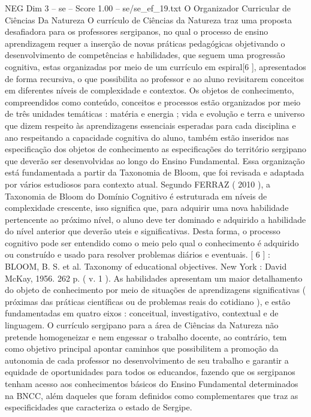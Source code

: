 \begin{textsample}{NEG Dim 3 – se – Score 1.00 – se/se\_ef\_19.txt}  \label{ex:f3_neg_128}
O Organizador Curricular de Ciências Da Natureza O currículo de Ciências da Natureza traz uma proposta desafiadora para os professores sergipanos, no qual o processo de ensino aprendizagem requer a inserção de novas práticas pedagógicas objetivando o desenvolvimento de competências e habilidades, que seguem uma progressão cognitiva, estas organizadas por meio de um currículo em espiral[6 ], apresentados de forma recursiva, o que possibilita ao professor e ao aluno revisitarem conceitos em diferentes níveis de complexidade e contextos.
Os objetos de conhecimento, compreendidos como conteúdo, conceitos e processos estão organizados por meio de três unidades temáticas : matéria e energia ; vida e evolução e terra e universo que dizem respeito às aprendizagens essenciais esperadas para cada disciplina e ano respeitando a capacidade cognitiva do aluno, também estão inseridos nas especificação dos objetos de conhecimento as especificações do território sergipano que deverão ser desenvolvidas ao longo do Ensino Fundamental.
Essa organização está fundamentada a partir da Taxonomia de Bloom, que foi revisada e adaptada por vários estudiosos para contexto atual.
Segundo FERRAZ ( 2010 ), a Taxonomia de Bloom do Domínio Cognitivo é estruturada em níveis de complexidade crescente, isso significa que, para adquirir uma nova habilidade pertencente ao próximo nível, o aluno deve ter dominado e adquirido a habilidade do nível anterior que deverão uteis e significativas.
Desta forma, o processo cognitivo pode ser entendido como o meio pelo qual o conhecimento é adquirido ou construído e usado para resolver problemas diários e eventuais. [ 6 ] : BLOOM, B.
S. et al.
Taxonomy of educational objectives.
New York : David McKay, 1956. 262 p. ( v. 1 ).
As habilidades apresentam um maior detalhamento do objeto de conhecimento por meio de situações de aprendizagens significativas ( próximas das práticas científicas ou de problemas reais do cotidiano ), e estão fundamentadas em quatro eixos : conceitual, investigativo, contextual e de linguagem.
O currículo sergipano para a área de Ciências da Natureza não pretende homogeneizar e nem engessar o trabalho docente, ao contrário, tem como objetivo principal apontar caminhos que possibilitem a promoção da autonomia de cada professor no desenvolvimento de seu trabalho e garantir a equidade de oportunidades para todos os educandos, fazendo que os sergipanos tenham acesso aos conhecimentos básicos do Ensino Fundamental determinados na BNCC, além daqueles que foram definidos como complementares que traz as especificidades que caracteriza o estado de Sergipe.

\end{textsample}
